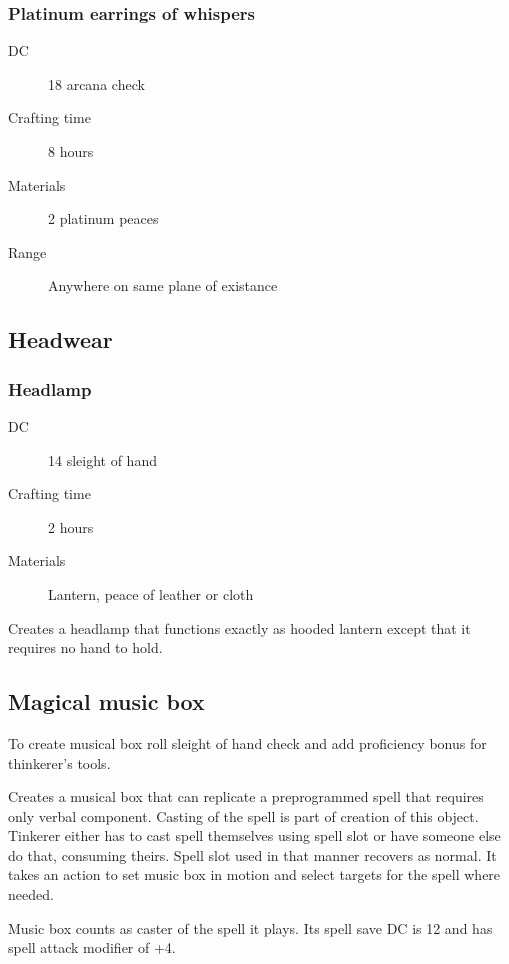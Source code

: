 \subsubsection{Platinum earrings of whispers}

\begin{description}
\item [DC] 18 arcana check
\item [Crafting time] 8 hours
\item [Materials] 2 platinum peaces
\item [Range] Anywhere on same plane of existance
\end{description}

\subsection{Headwear}

\subsubsection{Headlamp}

\begin{description}
\item [DC] 14 sleight of hand
\item [Crafting time] 2 hours
\item [Materials] Lantern, peace of leather or cloth
\end{description}

Creates a headlamp that functions exactly as hooded lantern except that it requires no hand to hold.

\subsection{Magical music box}

To create musical box roll sleight of hand check and add proficiency bonus for thinkerer's tools.

Creates a musical box that can replicate a preprogrammed spell that requires only verbal component. Casting of the spell is part of
creation of this object. Tinkerer either has to cast spell themselves using spell slot or have someone else do that, consuming theirs. Spell slot used in that manner recovers as normal. It takes an action to set music box in motion and select targets for the spell where needed.

Music box counts as caster of the spell it plays. Its spell save DC is 12 and has spell attack modifier of +4.

